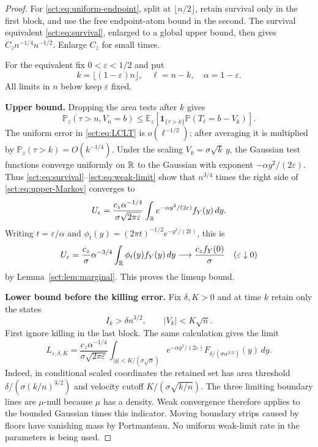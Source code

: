 \documentclass[11pt,letterpaper]{article}
\theoremstyle{definition}\newtheorem{remark}[theorem]{Remark}
\newcommand{\Pp}{\mathbb P}\newcommand{\Ee}{\mathbb E}
\newcommand{\ind}{\mathbf 1}\newcommand{\Vdw}{V_{\mathrm{DW}}}
\newcommand{\fY}{f_Y}\newcommand{\code}[1]{\texttt{#1}}
\begin{document}
\begin{proof}
For \eqref{sct:eq:uniform-endpoint}, split at $\lfloor n/2\rfloor$, retain survival
only in the first block, and use the free endpoint-atom bound in the second.
The survival equivalent \eqref{sct:eq:survival}, enlarged to a global upper bound,
then gives $C_z n^{-1/4}n^{-1/2}$. Enlarge $C_z$ for small times.

For the equivalent fix $0<\varepsilon<1/2$ and put
\[
 k=\lfloor(1-\varepsilon)n\rfloor,\quad \ell=n-k,
 \quad \alpha=1-\varepsilon.
\]
All limits in $n$ below keep $\varepsilon$ fixed.

\textbf{Upper bound.}
Dropping the area tests after $k$ gives
\begin{equation}\label{sct:eq:upper-Markov}
 \Pp_z(\tau>n,V_n=b)
 \le\Ee_z[\ind_{\{\tau>k\}}\Pp(T_\ell=b-V_k)].
\end{equation}
The uniform error in \eqref{sct:eq:LCLT} is $o(\ell^{-1/2})$; after averaging it is
multiplied by $\Pp_z(\tau>k)=O(k^{-1/4})$. Under the scaling
$V_k=\sigma\sqrt k\,y$, the Gaussian test functions converge uniformly on
$\mathbb R$ to the Gaussian with exponent $-\alpha y^2/(2\varepsilon)$.
Thus \eqref{sct:eq:survival}--\eqref{sct:eq:weak-limit} show that $n^{3/4}$ times the
right side of \eqref{sct:eq:upper-Markov} converges to
\begin{equation}\label{sct:eq:Ueps}
 U_\varepsilon=\frac{c_z\alpha^{-1/4}}{\sigma\sqrt{2\pi\varepsilon}}
 \int_\R e^{-\alpha y^2/(2\varepsilon)}\fY(y)\,dy.
\end{equation}
Writing $t=\varepsilon/\alpha$ and
$\phi_t(y)=(2\pi t)^{-1/2}e^{-y^2/(2t)}$, this is
\[
 U_\varepsilon=\frac{c_z}{\sigma}\alpha^{-3/4}
 \int_\R\phi_t(y)\fY(y)\,dy\longrightarrow\frac{c_z\fY(0)}{\sigma}
 \quad(\varepsilon\downarrow0)
\]
by Lemma~\ref{sct:lem:marginal}. This proves the limsup bound.

\textbf{Lower bound before the killing error.}
Fix $\delta,K>0$ and at time $k$ retain only the states
\begin{equation}\label{sct:eq:retained}
 I_k>\delta n^{3/2},\qquad |V_k|<K\sqrt n.
\end{equation}
First ignore killing in the last block. The same calculation gives the limit
\begin{equation}\label{sct:eq:Leps}
 L_{\varepsilon,\delta,K}=
 \frac{c_z\alpha^{-1/4}}{\sigma\sqrt{2\pi\varepsilon}}
 \int_{|y|<K/(\sigma\sqrt\alpha)}
 e^{-\alpha y^2/(2\varepsilon)}
 F_{\delta/(\sigma\alpha^{3/2})}(y)\,dy.
\end{equation}
Indeed, in conditional scaled coordinates the retained set has area threshold
$\delta/(\sigma(k/n)^{3/2})$ and velocity cutoff $K/(\sigma\sqrt{k/n})$.
The three limiting boundary lines are $\mu$-null because $\mu$ has a density.
Weak convergence therefore applies to the bounded Gaussian times this
indicator. Moving boundary strips caused by floors have vanishing mass by
Portmanteau. No uniform weak-limit rate in the parameters is being used.


\end{proof}
\end{document}
